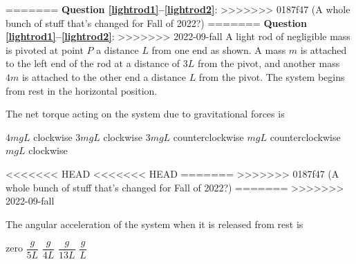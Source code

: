 \documentclass{../../oss-apphys-exam}
\begin{document}
\begin{multicols*}{2}
\begin{questions}
{=======
      \textbf{Question \ref{lightrod1}--\ref{lightrod2}}:
>>>>>>> 0187f47 (A whole bunch of stuff that's changed for Fall of 2022?)
=======
      \textbf{Question \ref{lightrod1}--\ref{lightrod2}}:
>>>>>>> 2022-09-fall
      A light rod of negligible mass is pivoted at point $P$ a distance
      $L$ from one end as shown. A mass $m$ is attached to the left end of the
      rod at a distance of $3L$ from the pivot, and another mass $4m$ is
      attached to the other end a distance $L$ from the pivot. The system
      begins from rest in the horizontal position.
      \begin{center}
      \end{center}
    }
    
    \question The net torque acting on the system due to gravitational forces is
    \label{lightrod1}
    \begin{choices}
      \choice $4mgL$ clockwise
      \choice $3mgL$ clockwise
      \choice $3mgL$ counterclockwise
      \choice $mgL$ counterclockwise
      \choice $mgL$ clockwise
    \end{choices}
<<<<<<< HEAD
<<<<<<< HEAD
=======
    \vspace{.6in}
>>>>>>> 0187f47 (A whole bunch of stuff that's changed for Fall of 2022?)
=======
    \vspace{.6in}
>>>>>>> 2022-09-fall
    
    \question The angular acceleration of the system when it is released from
    rest is
    \label{lightrod2}
    \begin{choices}
      \choice zero
      \choice $\dfrac g{5L}$
      \choice $\dfrac g{4L}$
      \choice $\dfrac g{13L}$
      \choice $\dfrac gL$
    \end{choices}
    

\end{questions}
\end{multicols*}
\end{document}
